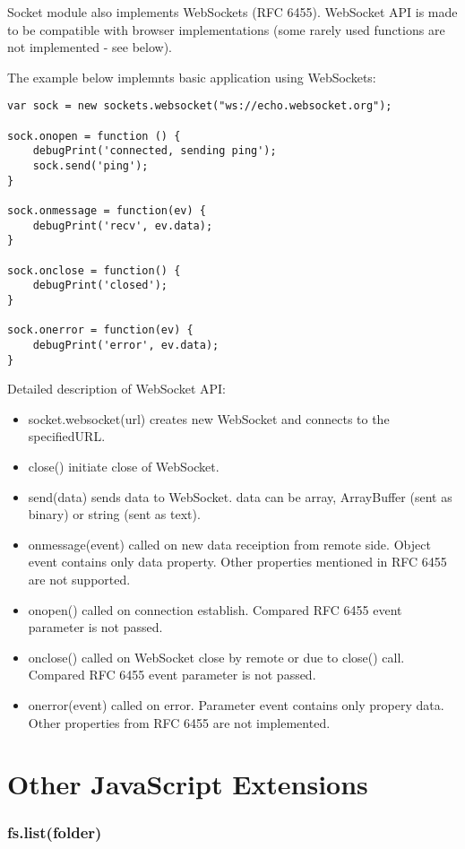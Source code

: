 Socket module also implements WebSockets (RFC 6455). WebSocket API is made to be
compatible with browser implementations (some rarely used functions are not
implemented - see below).

The example below implemnts basic application using WebSockets:

\begin{lstlisting}
var sock = new sockets.websocket("ws://echo.websocket.org");

sock.onopen = function () {
    debugPrint('connected, sending ping');
    sock.send('ping');
}

sock.onmessage = function(ev) {
    debugPrint('recv', ev.data);
}

sock.onclose = function() {
    debugPrint('closed');
}

sock.onerror = function(ev) {
    debugPrint('error', ev.data);
}
\end{lstlisting}

Detailed description of WebSocket API:
\begin{itemize}
\item socket.websocket(url) creates new WebSocket and connects to the specifiedURL.
\item close() initiate close of WebSocket.
\item send(data) sends data to WebSocket. data can be array, ArrayBuffer (sent as binary) or string (sent as text).
\item onmessage(event) called on new data receiption from remote side. Object event contains only data property. Other properties mentioned in RFC 6455 are not supported.
\item onopen() called on connection establish. Compared RFC 6455 event parameter is not passed.
\item onclose() called on WebSocket close by remote or due to close() call. Compared RFC 6455 event parameter is not passed.
\item onerror(event) called on error. Parameter event contains only propery data. Other properties from RFC 6455 are not implemented.
\end{itemize}

\section{Other JavaScript Extensions}

\subsubsection{fs.list(folder)}

